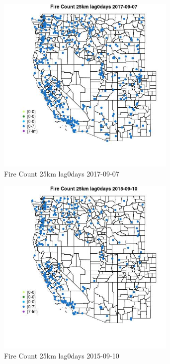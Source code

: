 \begin{figure} 
\centering  
\includegraphics[width=0.77\textwidth]{Code_Outputs/Report_ML_input_PM25_Step4_part_e_de_duplicated_aves_compiled_2019-05-21wNAs_MapObsFire_Count_25km_lag0days2017-09-07.jpg} 
\caption{\label{fig:Report_ML_input_PM25_Step4_part_e_de_duplicated_aves_compiled_2019-05-21wNAsMapObsFire_Count_25km_lag0days2017-09-07}Fire Count 25km lag0days 2017-09-07} 
\end{figure} 
 

\begin{figure} 
\centering  
\includegraphics[width=0.77\textwidth]{Code_Outputs/Report_ML_input_PM25_Step4_part_e_de_duplicated_aves_compiled_2019-05-21wNAs_MapObsFire_Count_25km_lag0days2015-09-10.jpg} 
\caption{\label{fig:Report_ML_input_PM25_Step4_part_e_de_duplicated_aves_compiled_2019-05-21wNAsMapObsFire_Count_25km_lag0days2015-09-10}Fire Count 25km lag0days 2015-09-10} 
\end{figure} 
 

